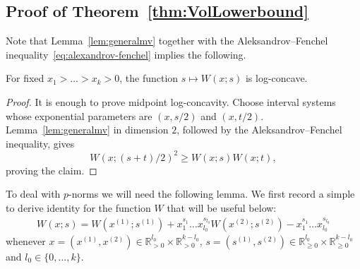 \documentclass[a4paper,reqno,12pt]{amsart}
\renewcommand{\r}{\mathbb{R}}
\newcommand{\1}{\bo{1}}
\begin{document}
\subsection{Proof of Theorem~\ref{thm:VolLowerbound}}
Note that Lemma~\ref{lem:generalmv} together with the Aleksandrov--Fenchel inequality~\eqref{eq:alexandrov-fenchel} implies the following.
\begin{corollary} \label{cor:logconcave}
	For fixed $x_1>\dots>x_k>0$, the function $s\mapsto W(x;s)$ is log-concave.
\end{corollary}
\begin{proof}
	It is enough to prove midpoint log-concavity. Choose interval systems whose exponential parameters are $(x,s/2)$ and $(x,t/2)$. Lemma~\ref{lem:generalmv} in dimension $2$, followed by the Aleksandrov--Fenchel inequality, gives
	\[W(x;(s+t)/2)^2 \ge W(x;s)W(x;t),\]
	proving the claim.
\end{proof}

To deal with $p$-norms we will need the following lemma. We first record a simple to derive identity for the function $W$ that will be useful below:
\begin{align}\label{eq:WfuncId}
W(x;s) = W(x^{(1)};s^{(1)})  +  x_1^{s_1} \dots x_{l_0}^{s_{l_0}}W(x^{(2)};s^{(2)}) - x_1^{s_1} \dots x_{l_0}^{s_{l_0}}
\end{align}
whenever $x=(x^{(1)},x^{(2)}) \in \r_{>0}^{l_0} \times \r_{>0}^{k-l_0}$, $s=(s^{(1)},s^{(2)}) \in \r_{\geq 0}^{l_0} \times \r_{\geq 0}^{k-l_0}$ and $l_0\in \{0,\dots,k\}$.
\end{document}
